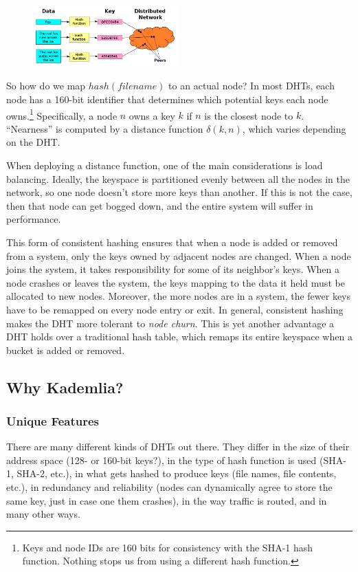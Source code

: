 \documentclass[11pt,twocolumn]{article}
\begin{document}
\begin{figure}[h!]
  \centering
  \includegraphics[width=0.5\textwidth]{images/DHT.png}
  \caption{\label{DHT}}
\end{figure}

So how do we map $hash(filename)$ to an actual node? 
In most DHTs, each node has a 160-bit identifier that determines which potential keys each node owns.\footnote{Keys and node IDs are 160 bits for consistency with the SHA-1 hash function. Nothing stops us from using a different hash function.}
Specifically, a node $n$ owns a key $k$ if $n$ is the closest node to $k$.
``Nearness'' is computed by a distance function $\delta(k, n)$, which varies depending on the DHT.

When deploying a distance function, one of the main considerations is load balancing.
Ideally, the keyspace is partitioned evenly between all the nodes in the network, so one node doesn't store more keys than another.
If this is not the case, then that node can get bogged down, and the entire system will suffer in performance.

This form of consistent hashing ensures that when a node is added or removed from a system, only the keys owned by adjacent nodes are changed. 
When a node joins the system, it takes responsibility for some of its neighbor's keys.
When a node crashes or leaves the system, the keys mapping to the data it held must be allocated to new nodes.
Moreover, the more nodes are in a system, the fewer keys have to be remapped on every node entry or exit.
In general, consistent hashing makes the DHT more tolerant to \emph{node churn}.
This is yet another advantage a DHT holds over a traditional hash table, which remaps its entire keyspace when a bucket is added or removed.

\subsection{Why Kademlia?}

\subsubsection{Unique Features}
There are many different kinds of DHTs out there.
They differ in the size of their address space (128- or 160-bit keys?), in the type of hash function is used (SHA-1, SHA-2, etc.), in what gets hashed to produce keys (file names, file contents, etc.), in redundancy and reliability (nodes can dynamically agree to store the same key, just in case one them crashes), in the way traffic is routed, and in many other ways.
\end{document}
